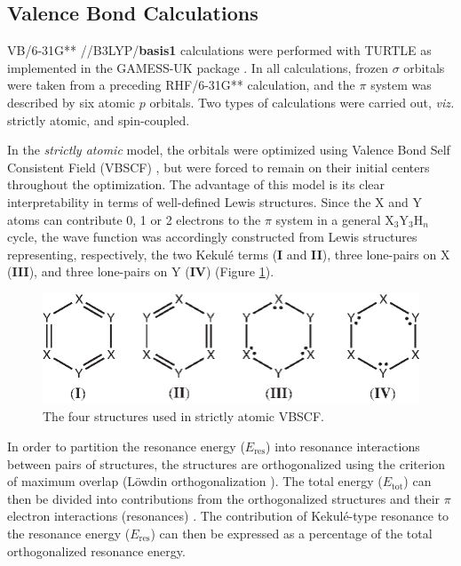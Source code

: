 \subsection{Valence Bond Calculations}

VB/6-31G** \cite{bs6_light,bs6_heavy,bs31light_a,bs31light_b,bs31heavyss}//B3LYP/\textbf{basis1}
calculations were performed with TURTLE \cite{turtle} as implemented in the GAMESS-UK
package \cite{gamess}. In all calculations, frozen $\sigma$ orbitals were taken from a preceding
RHF/6-31G** calculation, and the $\pi$ system was described by six atomic
$p$ orbitals. Two types of calculations were carried out, \textit{viz.} strictly atomic, and
spin-coupled. 

In the \textit{strictly atomic} model, the orbitals were optimized using Valence Bond
Self Consistent Field (\mbox{VBSCF}) \cite{vbscf1, vbscf2}, but were forced to
remain on their initial centers throughout the optimization. The advantage of
this model is its clear interpretability in terms of well-defined Lewis
structures. Since the X and Y atoms can contribute 0, 1 or 2 electrons to the $\pi$ system
in a general X$_3$Y$_3$H$_n$ cycle, the wave function was accordingly constructed from Lewis
structures representing, respectively, the two Kekul\'{e} terms (\textbf{I} and
\textbf{II}), three lone-pairs on X (\textbf{III}), and three lone-pairs on Y
(\textbf{IV}) (Figure \ref{ch6.figure1}).

\begin{figure}[htbp]
\center
\includegraphics[scale=0.96]{inorganic/figures/figure1.eps}
\caption{The four structures used in strictly atomic VBSCF.}
\label{ch6.figure1}
\end{figure}

In order to partition the resonance energy ($E_\mathrm{res}$) into resonance interactions between
pairs of structures, the structures are orthogonalized using the criterion of
maximum overlap (L\"owdin orthogonalization \cite{lowdin}). The total energy
($E_\mathrm{tot}$) can then be divided into contributions from the
orthogonalized structures and their $\pi$ electron interactions
(resonances) \cite{remcolowdin}. The contribution of 
Kekul\'e-type resonance to the resonance energy ($E_\mathrm{res}$) can then be
expressed as a percentage of the total orthogonalized resonance energy.

